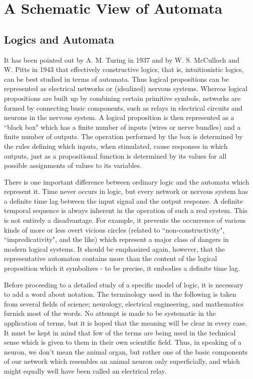\documentclass[twocolumn,preprintnumbers,amsmath,amssymb,floatfix]{revtex4}
\begin{document}
\section{\label{sec:two}A Schematic View of Automata}

\subsection{\label{sec:two1}Logics and Automata}

It has been pointed out by A. M. Turing \cite{Turing36} in 1937
and by W. S. McCulloch and W. Pitts \cite{McCulloch43} in 1943
that effectively constructive logics, that is, intuitionistic
logics, can be best studied in terms of automata. Thus logical
propositions can be represented as electrical networks or
(idealized) nervous systems. Whereas logical propositions are
built up by combining certain primitive symbols, networks are
formed by connecting basic components, such as relays in
electrical circuits and neurons in the nervous system. A logical
proposition is then represented as a ``black box" which has a
finite number of inputs (wires or nerve bundles) and a finite
number of outputs. The operation performed by the box is
determined by the rules defining which inputs, when stimulated,
cause responses in which outputs, just as a propositional function
is determined by its values for all possible assignments of values
to its variables.

There is one important difference between ordinary logic and the
automata which represent it. Time never occurs in logic, but every
network or nervous system has a definite time lag between the
input signal and the output response. A definite temporal sequence
is always inherent in the operation of such a real system. This is
not entirely a disadvantage. For example, it prevents the
occurrence of various kinds of more or less overt vicious circles
(related to ``non-constructivity", ``impredicativity", and the
like) which represent a major class of dangers in modern logical
systems. It should be emphasized again, however, that the
representative automaton contains more than the content of the
logical proposition which it symbolizes - to be precise, it
embodies a definite time lag.

Before proceeding to a detailed study of a specific model of
logic, it is necessary to add a word about notation. The
terminology used in the following is taken from several fields of
science; neurology, electrical engineering, and mathematics
furnish most of the words. No attempt is made to be systematic in
the application of terms, but it is hoped that the meaning will be
clear in every case. It must be kept in mind that few of the terms
are being used in the technical sense which is given to them in
their own scientific field. Thus, in speaking of a neuron, we
don't mean the animal organ, but rather one of the basic
components of our network which resembles an animal neuron only
superficially, and which might equally well have been called an
electrical relay.
\end{document}

